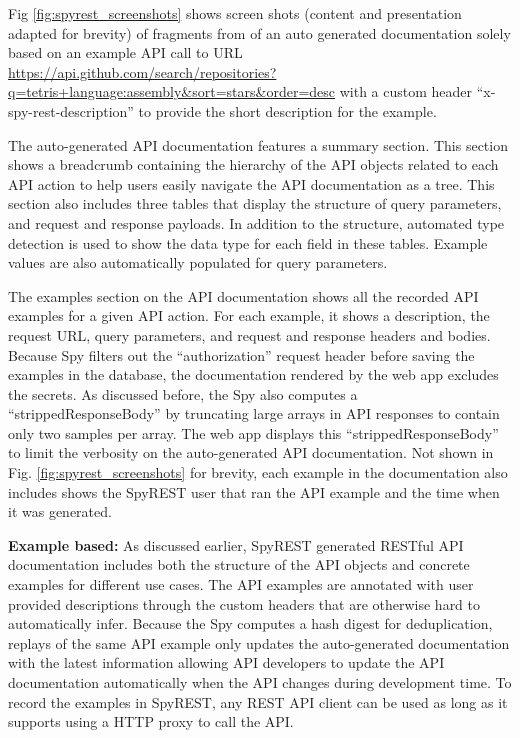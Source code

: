 \documentclass[conference]{IEEEtran}
\begin{document}
Fig \ref{fig:spyrest_screenshots} shows screen shots  (content and presentation adapted for brevity) of fragments from of an auto generated documentation solely based on an example API call to URL \url{https://api.github.com/search/repositories?q=tetris+language:assembly&sort=stars&order=desc} with a custom header ``x-spy-rest-description'' to provide the short description for the example.

The auto-generated API documentation features a summary section. This section shows a breadcrumb containing the hierarchy of the API objects related to each API action to help users easily navigate the API documentation as a tree. This section also includes three tables that display the structure of query parameters, and request and response payloads. In addition to the structure, automated type detection is used to show the data type for each field in these tables. Example values are also automatically populated for query parameters.

The examples section on the API documentation shows all the recorded API examples for a given API action. For each example, it shows a description, the request URL, query parameters, and request and response headers and bodies. Because Spy filters out the ``authorization'' request header before saving the examples in the database, the documentation rendered by the web app excludes the secrets. As discussed before, the Spy also computes a ``strippedResponseBody'' by truncating large arrays in API responses to contain only two samples per array. The web app displays this ``strippedResponseBody'' to limit the verbosity on the auto-generated API documentation. Not shown in Fig. \ref{fig:spyrest_screenshots} for brevity, each example in the documentation also includes shows the SpyREST user that ran the API example and the time when it was generated.

\textbf{Example based:} As discussed earlier, SpyREST generated RESTful API documentation includes both the structure of the API objects and concrete examples for different use cases. The API examples are annotated with user provided descriptions through the custom headers that are otherwise hard to automatically infer. Because the Spy computes a hash digest for deduplication, replays of the same API example only updates the auto-generated documentation with the latest information allowing API developers to update the API documentation automatically when the API changes during development time. To record the examples in SpyREST, any REST API client can be used as long as it supports using a HTTP proxy to call the API.
\end{document}
